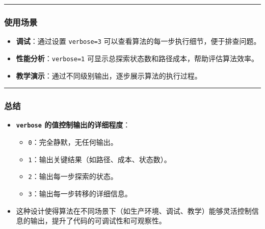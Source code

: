 \documentclass[
]{article}
\begin{document}
\begin{center}\rule{0.5\linewidth}{0.5pt}\end{center}

\subsubsection{\texorpdfstring{\textbf{使用场景}}{使用场景}}\label{header-n41}

\begin{itemize}
\item
  \textbf{调试}：通过设置 \texttt{verbose=3}
  可以查看算法的每一步执行细节，便于排查问题。
\item
  \textbf{性能分析}：\texttt{verbose=1}
  可显示总探索状态数和路径成本，帮助评估算法效率。
\item
  \textbf{教学演示}：通过不同级别输出，逐步展示算法的执行过程。
\end{itemize}

\begin{center}\rule{0.5\linewidth}{0.5pt}\end{center}

\subsubsection{\texorpdfstring{\textbf{总结}}{总结}}\label{header-n50}

\begin{itemize}
\item
  \textbf{\texttt{verbose} 的值控制输出的详细程度}：

  \begin{itemize}
  \item
    \texttt{0}：完全静默，无任何输出。
  \item
    \texttt{1}：输出关键结果（如路径、成本、状态数）。
  \item
    \texttt{2}：输出每一步探索的状态。
  \item
    \texttt{3}：输出每一步转移的详细信息。
  \end{itemize}
\item
  这种设计使得算法在不同场景下（如生产环境、调试、教学）能够灵活控制信息的输出，提升了代码的可调试性和可观察性。
\end{itemize}
\end{document}
